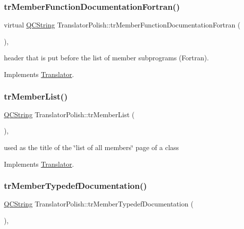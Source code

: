 \subsubsection{\texorpdfstring{trMemberFunctionDocumentationFortran()}{trMemberFunctionDocumentationFortran()}}
{\footnotesize\ttfamily virtual \mbox{\hyperlink{class_q_c_string}{Q\+C\+String}} Translator\+Polish\+::tr\+Member\+Function\+Documentation\+Fortran (\begin{DoxyParamCaption}{ }\end{DoxyParamCaption})\hspace{0.3cm}{\ttfamily [inline]}, {\ttfamily [virtual]}}

header that is put before the list of member subprograms (Fortran). 

Implements \mbox{\hyperlink{class_translator}{Translator}}.

\mbox{\label{class_translator_polish_aa79fac5e1171b2a5dab0d0464784ebff}} 
\subsubsection{\texorpdfstring{trMemberList()}{trMemberList()}}
{\footnotesize\ttfamily \mbox{\hyperlink{class_q_c_string}{Q\+C\+String}} Translator\+Polish\+::tr\+Member\+List (\begin{DoxyParamCaption}{ }\end{DoxyParamCaption})\hspace{0.3cm}{\ttfamily [inline]}, {\ttfamily [virtual]}}

used as the title of the \char`\"{}list of all members\char`\"{} page of a class 

Implements \mbox{\hyperlink{class_translator}{Translator}}.

\mbox{\label{class_translator_polish_a17b66291ed3f31b237865c8061d4fe54}} 
\subsubsection{\texorpdfstring{trMemberTypedefDocumentation()}{trMemberTypedefDocumentation()}}
{\footnotesize\ttfamily \mbox{\hyperlink{class_q_c_string}{Q\+C\+String}} Translator\+Polish\+::tr\+Member\+Typedef\+Documentation (\begin{DoxyParamCaption}{ }\end{DoxyParamCaption})\hspace{0.3cm}{\ttfamily [inline]}, {\ttfamily [virtual]}}

